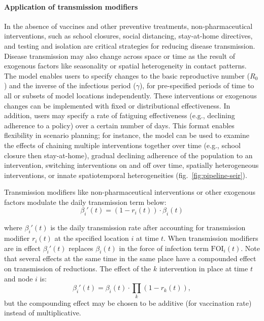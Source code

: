 {\paragraph{Application of transmission modifiers}
In the absence of vaccines and other preventive treatments, non-pharmaceutical interventions, such as school closures, social distancing, stay-at-home directives, and testing and isolation are critical strategies for reducing disease transmission. Disease transmission may also change across space or time as the result of exogenous factors like seasonality or spatial heterogeneity in contact patterns. The model enables users to specify changes to the basic reproductive number ($R_0$) and the inverse of the infectious period ($\gamma$), for pre-specified periods of time to all or subsets of model locations independently. These interventions or exogenous changes can be implemented with fixed or distributional effectiveness. In addition, users may specify a rate of fatiguing effectiveness (e.g., declining adherence to a policy) over a certain number of days. This format enables flexibility in scenario planning; for instance, the model can be used to examine the effects of chaining multiple interventions together over time (e.g., school closure then stay-at-home), gradual declining adherence of the population to an intervention, switching interventions on and off over time, spatially heterogeneous interventions, or innate spatiotemporal heterogeneities (fig.~\ref{fig:pipeline-seir}).

Transmission modifiers like non-pharmaceutical interventions or other exogenous factors modulate the daily transmission term below:
\begin{equation}
\beta _i'(t)=\left(1-r_i(t)\right)\cdot \beta_i (t)
\end{equation}

where $\beta_i'(t)$ is the daily transmission rate after accounting for transmission modifier $r_i(t)$ at the specified location $i$ at time $t$. When transmission modifiers are in effect $\beta_i'(t)$ replaces $\beta_i(t)$ in the force of infection term $\text{FOI}_i(t)$.
Note that several effects at the same time in the same place have a compounded effect on transmission of reductions. The effect of the $k$ intervention in place at time $t$ and node $i$ is:
\begin{equation}
	\beta_i'(t) =  \beta_i(t) \cdot  \prod_k \left(1-r_k(t) \right), \label{eq:npi_comp}
\end{equation}
but the compounding effect may be chosen to be additive (\eg for vaccination rate) instead of multiplicative.

}
